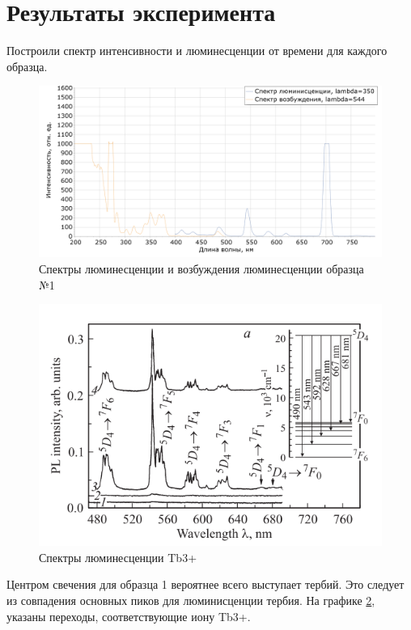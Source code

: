 \section{Результаты эксперимента}\label{sec:results}

Построили спектр интенсивности и
люминесценции от времени для каждого образца.
\begin{figure}[H]
	\centering
	\includegraphics[width=7in]{figures/Obr_1}
	\caption{Спектры люминесценции и возбуждения люминесценции образца №1}
	\label{fig:Lum1}
\end{figure}

\begin{figure}[H]
	\centering
	\includegraphics[width=5in]{figures/img}
	\caption{Спектры люминесценции Tb3+\cite{AfotoTB3}}
	\label{fig:LumTb}
\end{figure}

Центром свечения для образца 1 вероятнее всего выступает тербий.
Это следует из совпадения основных пиков для люминисценции тербия.
На графике \ref{fig:LumTb}, указаны переходы, соответствующие иону Tb3+.


